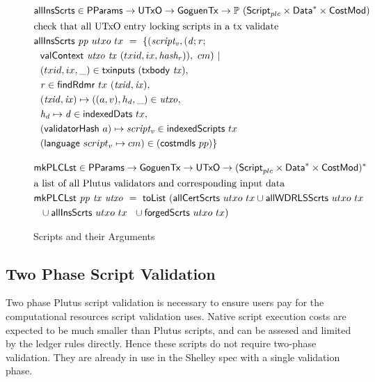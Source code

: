 \begin{figure}[htb]
  \begin{align*}
    & \fun{allInsScrts} \in \PParams \to \UTxO \to \GoguenTx \to \powerset{(\ScriptPlutus\times\seqof{\Data} \times \CostMod)} \\
    & \text{check that all UTxO entry locking scripts in a tx validate} \\
    & \fun{allInsScrts}~\var{pp}~{utxo}~{tx}~=~ \{ (\var{script_v}, (\var{d};\var{r}; \\
    & ~~ \fun{valContext}~\var{utxo}~\var{tx}~
      (txid,ix,\var{hash_r})),~cm) ~\vert \\
    & ~~(txid,ix, \_) \in \fun{txinputs}~(\txbody{tx}), \\
    & ~~\var{r} \in \fun{findRdmr}~{tx}~\var{(txid,ix)}, \\
    & ~~\var{(txid,ix)} \mapsto ((a,v),h_d, \_) \in \var{utxo}, \\
    & ~~\var{h_d}\mapsto \var{d} \in \fun{indexedDats}~{tx}, \\
    & ~~(\fun{validatorHash}~{a})\mapsto \var{script_v}\in \fun{indexedScripts}~{tx} \\
    &~~(\fun{language}~{script_v} \mapsto cm)\in(\fun{costmdls}~{pp}) \}
    \nextdef
    & \fun{mkPLCLst} \in \PParams \to \GoguenTx \to \UTxO \to \seqof{(\ScriptPlutus \times \seqof{\Data} \times \CostMod)} \\
    & \text{a list of all Plutus validators and corresponding input data} \\
    & \fun{mkPLCLst} ~\var{pp}~\var{tx}~ \var{utxo} ~=~
    \fun{toList}~(\fun{allCertScrts}~{utxo}~{tx} \cup \fun{allWDRLSScrts}~{utxo}~{tx} \\
    & ~~ \cup \fun{allInsScrts}~{utxo}~{tx} ~~ \cup \fun{forgedScrts}~{utxo}~{tx}) \\
  \end{align*}
  \caption{Scripts and their Arguments}
  \label{fig:functions:script3}
\end{figure}

\subsection{Two Phase Script Validation}
\label{sec:two-phase}

Two phase Plutus script validation is necessary to ensure users pay for the
computational resources script validation uses.
Native script execution costs are expected to be much smaller than Plutus
scripts, and can be assesed and limited by the ledger rules directly.
Hence these scripts do not require two-phase validation. They are already
in use in the Shelley spec with a single validation phase.

